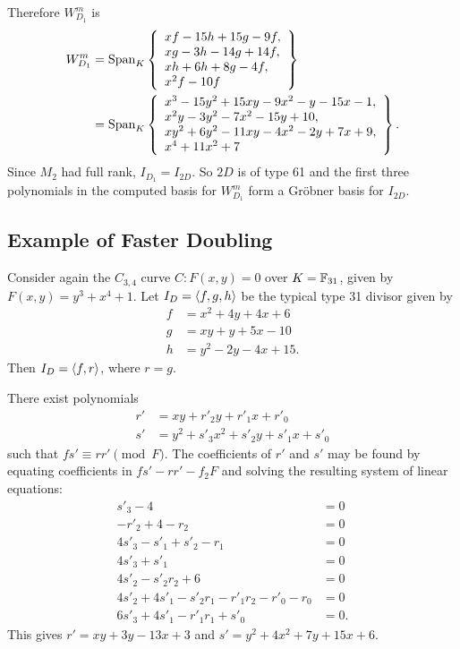 Therefore $W_{D_1}^m$ is
\begin{align*}
  W_{D_1}^m &= \operatorname{Span}_K
\left\{ \begin{array}{l}
    xf - 15h + 15g - 9f, \\
    xg - 3h - 14g + 14f, \\
    xh + 6h + 8g - 4f, \\
    x^2f - 10f
\end{array} \right\} \\
&= \operatorname{Span}_K
\left\{ \begin{array}{l}
    x^3 - 15y^2 + 15xy - 9x^2 - y - 15x - 1, \\
    x^2y - 3y^2 - 7x^2 - 15y + 10, \\ 
    xy^2 + 6y^2 - 11xy - 4x^2 - 2y + 7x + 9, \\
    x^4 + 11x^2 + 7
\end{array} \right\}.
\end{align*}
Since $M_2$ had full rank, $I_{D_1} = I_{2D}$.
So $2D$ is of type 61 and the first three polynomials
in the computed basis for $W_{D_1}^m$ form a Gr\"obner basis for $I_{2D}$.




\subsection{Example of Faster Doubling}
\label{sec_fast_doubling_example}

Consider again the $C_{3,4}$ curve $C : F(x,y) = 0$ over $K = \mathbb{F}_{31}$,
given by $F(x,y) = y^3 + x^4 + 1$.
Let $I_D = \left\langle f,g,h \right\rangle$ be the typical type 31 divisor given by
\begin{align*}
  f &= x^2 + 4y + 4x + 6 \\
  g &= xy + y + 5x - 10 \\
  h &= y^2 - 2y - 4x + 15.
\end{align*}
Then $I_D = \left\langle f,r \right\rangle$, where $r = g$.

There exist polynomials
\begin{align*}
  r' &= xy + r'_2y + r'_1x + r'_0 \\
  s' &= y^2 + s'_3x^2 + s'_2y + s'_1x + s'_0
\end{align*}
such that $fs' \equiv rr' \pmod F$.
The coefficients of $r'$ and $s'$ may be found by equating coefficients in $fs' - rr' - f_2F$
and solving the resulting system of linear equations:
\begin{align*}
  s'_3 - 4 &= 0 \\
  -r'_2 + 4 - r_2 &= 0 \\
  4s'_3 - s'_1 + s'_2 - r_1 &= 0 \\
  4s'_3 + s'_1 &= 0 \\
  4s'_2 - s'_2r_2 + 6 &= 0 \\
  4s'_2 + 4s'_1 - s'_2r_1 - r'_1r_2 - r'_0 - r_0 &= 0 \\
  6s'_3 + 4s'_1 - r'_1r_1 + s'_0 &= 0.
\end{align*}
This gives $r' = xy + 3y - 13x + 3$ and $s' = y^2 + 4x^2 + 7y + 15x + 6$.

